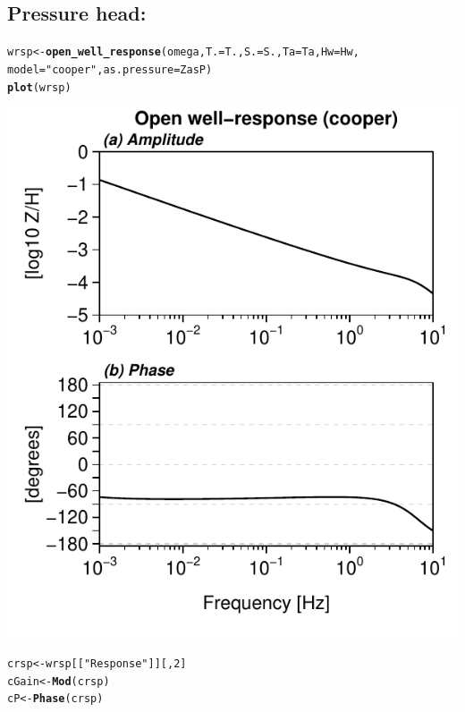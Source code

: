 \documentclass[12pt]{article}\usepackage[]{graphicx}\usepackage[]{color}
\makeatletter
\def\maxwidth{ %
  \ifdim\Gin@nat@width>\linewidth
    \linewidth
  \else
    \Gin@nat@width
  \fi
}
\newcommand{\hlnum}[1]{\textcolor[rgb]{0.686,0.059,0.569}{#1}}%
\newcommand{\hlstr}[1]{\textcolor[rgb]{0.192,0.494,0.8}{#1}}%
\newcommand{\hlstd}[1]{\textcolor[rgb]{0.345,0.345,0.345}{#1}}%
\newcommand{\hlkwb}[1]{\textcolor[rgb]{0.69,0.353,0.396}{#1}}%
\newcommand{\hlkwc}[1]{\textcolor[rgb]{0.333,0.667,0.333}{#1}}%
\newcommand{\hlkwd}[1]{\textcolor[rgb]{0.737,0.353,0.396}{\textbf{#1}}}%
\newenvironment{kframe}{%
 \def\at@end@of@kframe{}%
 \ifinner\ifhmode%
  \def\at@end@of@kframe{\end{minipage}}%
  \begin{minipage}{\columnwidth}%
 \fi\fi%
 \def\FrameCommand##1{\hskip\@totalleftmargin \hskip-\fboxsep
 \colorbox{shadecolor}{##1}\hskip-\fboxsep
     \hskip-\linewidth \hskip-\@totalleftmargin \hskip\columnwidth}%
 \MakeFramed {\advance\hsize-\width
   \@totalleftmargin\z@ \linewidth\hsize
   \@setminipage}}%
 {\par\unskip\endMakeFramed%
 \at@end@of@kframe}
\newenvironment{knitrout}{}{} %
\makeatother
\begin{document}
\subsection{Pressure head: \citet{cooper1965}}

\begin{knitrout}\small
{}\color{fgcolor}\begin{kframe}
\begin{alltt}
\hlstd{wrsp} \hlkwb{<-} \hlkwd{open_well_response}\hlstd{(omega,} \hlkwc{T.} \hlstd{= T.,} \hlkwc{S.} \hlstd{= S.,} \hlkwc{Ta} \hlstd{= Ta,} \hlkwc{Hw} \hlstd{= Hw,}
    \hlkwc{model} \hlstd{=} \hlstr{"cooper"}\hlstd{,} \hlkwc{as.pressure} \hlstd{= ZasP)}
\hlkwd{plot}\hlstd{(wrsp)}
\end{alltt}
\end{kframe}
\includegraphics[width=\maxwidth]{figure/COOPERRESP} 
\begin{kframe}\begin{alltt}
\hlstd{crsp} \hlkwb{<-} \hlstd{wrsp[[}\hlstr{"Response"}\hlstd{]][,} \hlnum{2}\hlstd{]}
\hlstd{cGain} \hlkwb{<-} \hlkwd{Mod}\hlstd{(crsp)}
\hlstd{cP} \hlkwb{<-} \hlkwd{Phase}\hlstd{(crsp)}
\end{alltt}
\end{kframe}
\end{knitrout}
\end{document}
